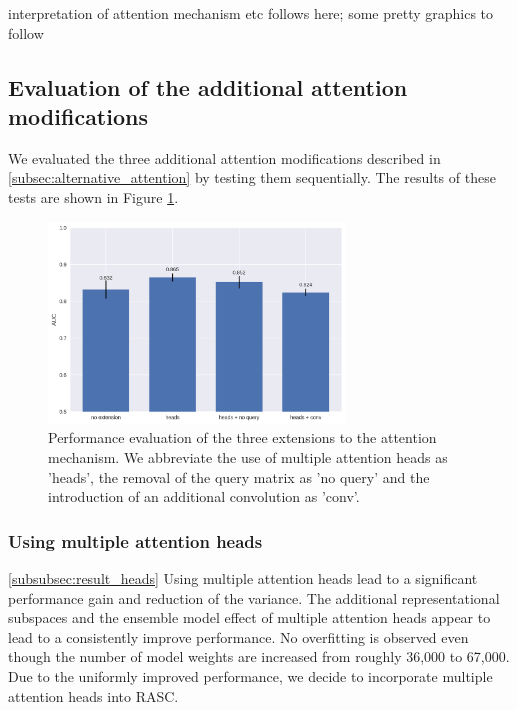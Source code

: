 
interpretation of attention mechanism etc follows here; some pretty graphics to follow

\subsection{Evaluation of the additional attention modifications} \label{subsubsec:attn_hyperparams}

We evaluated the three additional attention modifications described in \ref{subsec:alternative_attention} by testing them sequentially. The results of these tests are shown in Figure \ref{fig:attn_extension_barcharts}. 

\begin{figure}
	\centering\includegraphics[width=0.7\textwidth]{../visualizations/ch5-results/attn_extension_barcharts.png} 
	\caption{Performance evaluation of the three extensions to the attention mechanism. We abbreviate the use of multiple attention heads as 'heads', the removal of the query matrix as 'no query' and the introduction of an additional convolution as 'conv'. }
	\label{fig:attn_extension_barcharts}
\end{figure}

\subsubsection{Using multiple attention heads} \ref{subsubsec:result_heads}
Using multiple attention heads lead to a significant performance gain and reduction of the variance. The additional representational subspaces and the ensemble model effect of multiple attention heads appear to lead to a consistently improve performance. No overfitting is observed even though the number of model weights are increased from roughly 36,000 to 67,000. Due to the uniformly improved performance, we decide to incorporate multiple attention heads into RASC. 

